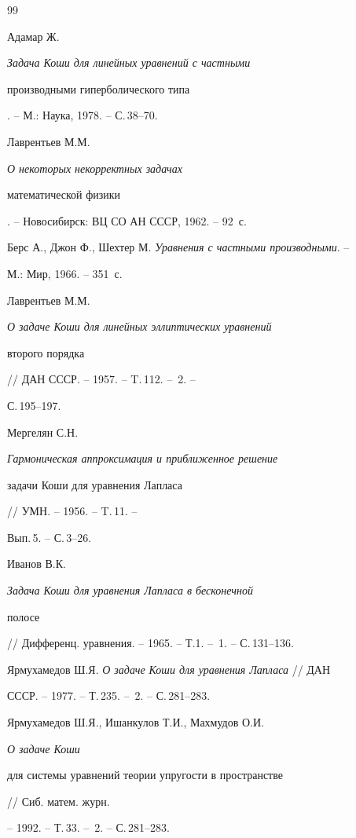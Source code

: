 \begin{thebibliography}{99} 


 




Адамар Ж. {\em Задача Коши для линейных уравнений с частными 


производными гиперболического типа}. -- М.: Наука, 1978. -- С.\,38--70. 




Лаврентьев М.М. {\em О некоторых некорректных задачах 


математической физики}. -- Новосибирск: ВЦ СО АН СССР, 1962. -- 92~с. 




Берс А., Джон Ф., Шехтер М. {\em Уравнения с частными производными}. -- 


М.: Мир, 1966. -- 351~с. 




Лаврентьев М.М. {\em О задаче Коши для линейных эллиптических уравнений 


второго порядка} // ДАН СССР. -- 1957. -- T.\,112. -- \No\,2. -- 


С.\,195--197. 




Мергелян С.Н. {\em Гармоническая аппроксимация и приближенное решение 


задачи Коши для уравнения Лапласа} // УМН. -- 1956. -- T.\,11. -- 


Вып.\,5. -- С.\,3--26. 




Иванов В.К. {\em Задача Коши для уравнения Лапласа в бесконечной 


полосе} // Дифференц. уравнения. -- 1965. -- Т.1. -- \No\,1. -- С.\,131--136. 




Ярмухамедов Ш.Я. {\em О задаче Коши для уравнения Лапласа} // ДАН 


СССР. -- 1977. -- Т.\,235. -- \No\,2. -- С.\,281--283. 




Ярмухамедов Ш.Я., Ишанкулов Т.И., Махмудов О.И. {\em О задаче Коши 


для системы уравнений теории упругости в пространстве} // Сиб. матем. журн. 


-- 1992. -- Т.\,33. -- \No\,2. -- С.\,281--283. 





\end{thebibliography}
